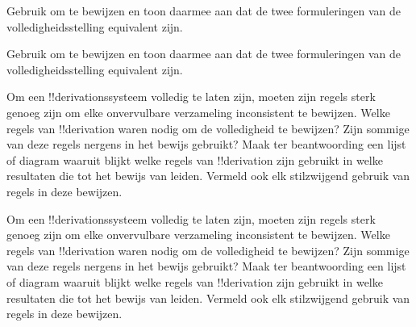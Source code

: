 \documentclass[openany]{memoir}
\begin{document}
\begin{prob}
Gebruik  om
 te bewijzen en toon daarmee aan
dat de twee formuleringen van de volledigheidsstelling equivalent zijn.
\end{prob}
\tagendprob

\begin{prob}
Gebruik  om
 te bewijzen en toon daarmee aan
dat de twee formuleringen van de volledigheidsstelling equivalent zijn.
\end{prob}
\tagendprob

\begin{prob}
Om een !!{derivation}ssysteem volledig te laten zijn, moeten zijn regels
sterk genoeg zijn om elke onvervulbare verzameling inconsistent te
bewijzen. Welke regels van !!{derivation} waren nodig om de volledigheid
te bewijzen? Zijn sommige van deze regels nergens in het bewijs gebruikt?
Maak ter beantwoording een lijst of diagram waaruit blijkt welke regels
van !!{derivation} zijn gebruikt in welke resultaten die tot het bewijs
van  leiden. Vermeld ook elk
stilzwijgend gebruik van regels in deze bewijzen.
\end{prob}
\tagendprob

\begin{prob}
Om een !!{derivation}ssysteem volledig te laten zijn, moeten zijn regels
sterk genoeg zijn om elke onvervulbare verzameling inconsistent te
bewijzen. Welke regels van !!{derivation} waren nodig om de volledigheid
te bewijzen? Zijn sommige van deze regels nergens in het bewijs gebruikt?
Maak ter beantwoording een lijst of diagram waaruit blijkt welke regels
van !!{derivation} zijn gebruikt in welke resultaten die tot het bewijs
van  leiden. Vermeld ook elk
stilzwijgend gebruik van regels in deze bewijzen.
\end{prob}
\tagendprob
\endgroup

\begingroup
\def\olfilename{OLP-0135}
\def\olfilepath{content/first-order-logic/completeness/}
\hypertarget{unit-OLP-0135}{}
\end{document}
